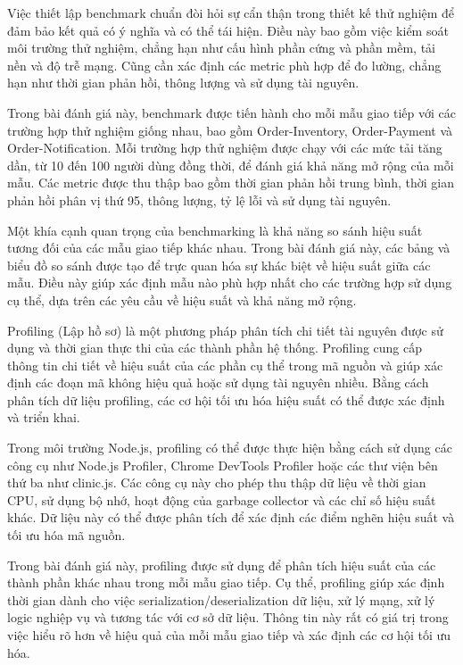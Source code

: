 Việc thiết lập benchmark chuẩn đòi hỏi sự cẩn thận trong thiết kế thử nghiệm để đảm bảo kết quả có ý nghĩa và có thể tái hiện. Điều này bao gồm việc kiểm soát môi trường thử nghiệm, chẳng hạn như cấu hình phần cứng và phần mềm, tải nền và độ trễ mạng. Cũng cần xác định các metric phù hợp để đo lường, chẳng hạn như thời gian phản hồi, thông lượng và sử dụng tài nguyên.

Trong bài đánh giá này, benchmark được tiến hành cho mỗi mẫu giao tiếp với các trường hợp thử nghiệm giống nhau, bao gồm Order-Inventory, Order-Payment và Order-Notification. Mỗi trường hợp thử nghiệm được chạy với các mức tải tăng dần, từ 10 đến 100 người dùng đồng thời, để đánh giá khả năng mở rộng của mỗi mẫu. Các metric được thu thập bao gồm thời gian phản hồi trung bình, thời gian phản hồi phân vị thứ 95, thông lượng, tỷ lệ lỗi và sử dụng tài nguyên.

Một khía cạnh quan trọng của benchmarking là khả năng so sánh hiệu suất tương đối của các mẫu giao tiếp khác nhau. Trong bài đánh giá này, các bảng và biểu đồ so sánh được tạo để trực quan hóa sự khác biệt về hiệu suất giữa các mẫu. Điều này giúp xác định mẫu nào phù hợp nhất cho các trường hợp sử dụng cụ thể, dựa trên các yêu cầu về hiệu suất và khả năng mở rộng.

Profiling (Lập hồ sơ) là một phương pháp phân tích chi tiết tài nguyên được sử dụng và thời gian thực thi của các thành phần hệ thống. Profiling cung cấp thông tin chi tiết về hiệu suất của các phần cụ thể trong mã nguồn và giúp xác định các đoạn mã không hiệu quả hoặc sử dụng tài nguyên nhiều. Bằng cách phân tích dữ liệu profiling, các cơ hội tối ưu hóa hiệu suất có thể được xác định và triển khai.

Trong môi trường Node.js, profiling có thể được thực hiện bằng cách sử dụng các công cụ như Node.js Profiler, Chrome DevTools Profiler hoặc các thư viện bên thứ ba như clinic.js. Các công cụ này cho phép thu thập dữ liệu về thời gian CPU, sử dụng bộ nhớ, hoạt động của garbage collector và các chỉ số hiệu suất khác. Dữ liệu này có thể được phân tích để xác định các điểm nghẽn hiệu suất và tối ưu hóa mã nguồn.

Trong bài đánh giá này, profiling được sử dụng để phân tích hiệu suất của các thành phần khác nhau trong mỗi mẫu giao tiếp. Cụ thể, profiling giúp xác định thời gian dành cho việc serialization/deserialization dữ liệu, xử lý mạng, xử lý logic nghiệp vụ và tương tác với cơ sở dữ liệu. Thông tin này rất có giá trị trong việc hiểu rõ hơn về hiệu quả của mỗi mẫu giao tiếp và xác định các cơ hội tối ưu hóa.

